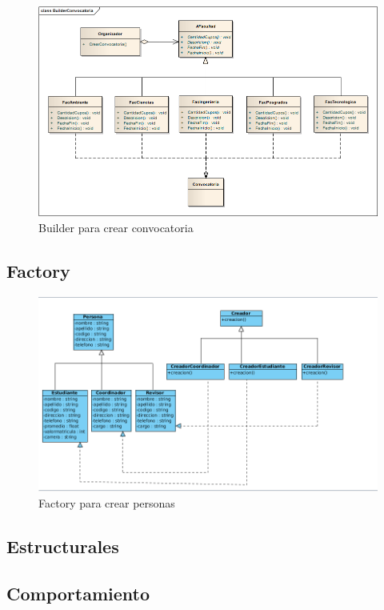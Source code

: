 \begin{figure}[th!]
	\centering
	\includegraphics[width=1.2\linewidth]{uml/Patrones/BuilderConvocatoria}
	\caption{Builder para crear convocatoria}
	\label{fig:Builder para convocatoria}
\end{figure}



\subsection{Factory}

\begin{figure}[th!]
	\centering
	\includegraphics[width=1.2\linewidth]{uml/Patrones/FactoryMethod}
	\caption{Factory para crear personas}
	\label{fig:Factory}
\end{figure}

\newpage

\subsection{Estructurales}

\subsection{Comportamiento}





